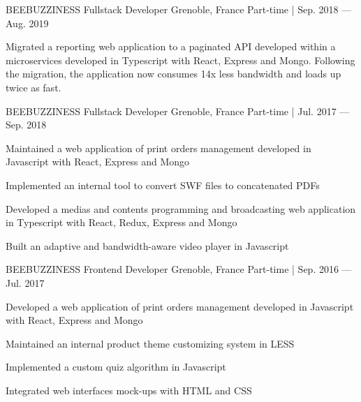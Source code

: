 

\begin{cventries}

    \cventry
    {BEEBUZZINESS} %
    {Fullstack Developer} %
    {Grenoble, France} %
    {Part-time | Sep. 2018 — Aug. 2019} %
    {
    \begin{cvitems} %
        \item {Migrated a reporting web application to a paginated API developed within a microservices developed in Typescript with React, Express and Mongo.
        Following the migration, the application now consumes 14x less bandwidth and loads up twice as fast.}
    \end{cvitems}
    }

    \cventry
    {BEEBUZZINESS} %
    {Fullstack Developer} %
    {Grenoble, France} %
    {Part-time | Jul. 2017 — Sep. 2018} %
    {
    \begin{cvitems} %
        \item {Maintained a web application of print orders management developed in Javascript with React, Express and Mongo}
        \item {Implemented an internal tool to convert SWF files to concatenated PDFs}
        \item {Developed a medias and contents programming and broadcasting web application in Typescript with React, Redux, Express and Mongo}
        \item {Built an adaptive and bandwidth-aware video player in Javascript}
    \end{cvitems}
    }

    \cventry
    {BEEBUZZINESS} %
    {Frontend Developer} %
    {Grenoble, France} %
    {Part-time | Sep. 2016 — Jul. 2017} %
    {
    \begin{cvitems} %
        \item {Developed a web application of print orders management developed in Javascript with React, Express and Mongo}
        \item {Maintained an internal product theme customizing system in LESS}
        \item {Implemented a custom quiz algorithm in Javascript}
        \item {Integrated web interfaces mock-ups with HTML and CSS}
    \end{cvitems}
    }

\end{cventries}
